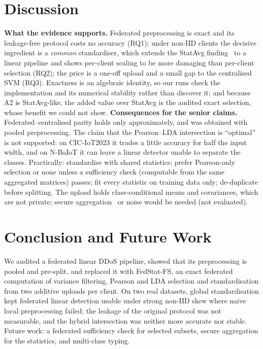 \section{Discussion}\label{sec:discussion}
\textbf{What the evidence supports.} Federated preprocessing is exact and its leakage-free protocol costs no accuracy (RQ1); under non-IID clients the decisive ingredient is a \emph{common} standardiser, which extends the StatAvg finding~\cite{bouzinis2025} to a linear pipeline and shows per-client scaling to be more damaging than per-client selection (RQ2); the price is a one-off upload and a small gap to the centralised SVM (RQ3). Exactness is an algebraic identity, so our runs check the implementation and its numerical stability rather than discover it; and because A2 is StatAvg-like, the added value over StatAvg is the audited exact selection, whose benefit we could not show.
\textbf{Consequences for the senior claims.} Federated--centralised parity holds only approximately, and was obtained with pooled preprocessing. The claim that the Pearson--LDA intersection is ``optimal''~\cite{senior2026} is not supported: on CIC-IoT2023 it trades a little accuracy for half the input width, and on N-BaIoT it can leave a linear detector unable to separate the classes. Practically: standardise with shared statistics; prefer Pearson-only selection or none unless a sufficiency check (computable from the same aggregated matrices) passes; fit every statistic on training data only; de-duplicate before splitting. The upload holds class-conditional means and covariances, which are not private; secure aggregation~\cite{bonawitz2017} or noise would be needed (not evaluated).


\section{Conclusion and Future Work}\label{sec:conclusion}
We audited a federated linear DDoS pipeline, showed that its preprocessing is pooled and pre-split, and replaced it with FedStat-FS, an exact federated computation of variance filtering, Pearson and LDA selection and standardisation from two additive uploads per client. On two real datasets, global standardisation kept federated linear detection usable under strong non-IID skew where naive local preprocessing failed; the leakage of the original protocol was not measurable, and the hybrid intersection was neither more accurate nor stable. Future work: a federated sufficiency check for selected subsets, secure aggregation for the statistics, and multi-class typing.
